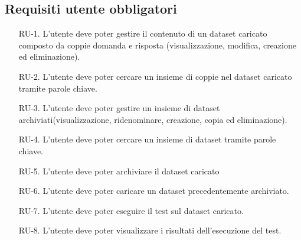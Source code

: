\subsection{Requisiti utente obbligatori}
\begin{enumerate}

    \label{item:RU-1}
    \item[RU-1.] L'utente deve poter gestire il contenuto di un dataset caricato composto da coppie domanda e risposta (visualizzazione,
     modifica, creazione ed eliminazione).
    
    \label{item:RU-2}
    \item[RU-2.] L'utente deve poter cercare un insieme di coppie nel dataset caricato tramite parole chiave.
    
    \label{item:RU-3}
    \item[RU-3.] L'utente deve poter gestire un insieme di dataset archiviati(visualizzazione, ridenominare, creazione, copia ed eliminazione).
    
    \label{item:RU-4}
    \item[RU-4.] L'utente deve poter cercare un insieme di dataset tramite parole chiave.
    
    \label{item:RU-5}
    \item[RU-5.] L'utente deve poter archiviare il dataset caricato
    
    \label{item:RU-6}
    \item[RU-6.] L'utente deve poter caricare un dataset precedentemente archiviato.
    
    \label{item:RU-7}
    \item[RU-7.] L'utente deve poter eseguire il test sul dataset caricato.
    
    \label{item:RU-8}
    \item[RU-8.] L'utente deve poter visualizzare i risultati dell’esecuzione del test.
\end{enumerate}

